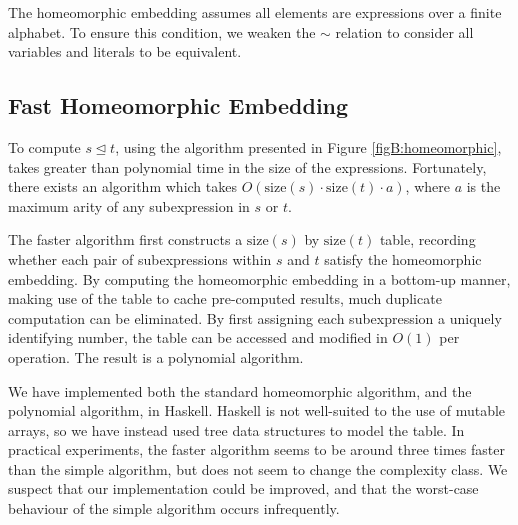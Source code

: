 The homeomorphic embedding assumes all elements are expressions over a finite alphabet. To ensure this condition, we weaken the $\sim$ relation to consider all variables and literals to be equivalent.

\subsection{Fast Homeomorphic Embedding}

To compute $s \unlhd t$, using the algorithm presented in Figure \ref{figB:homeomorphic}, takes greater than polynomial time in the size of the expressions. Fortunately, there exists an algorithm \cite{stillman:computational_problems,stillman:homeomorphic} which takes $O(\text{size}(s) \cdot \text{size}(t) \cdot a)$, where $a$ is the maximum arity of any subexpression in $s$ or $t$.

The faster algorithm first constructs a $\text{size}(s)$ by $\text{size}(t)$ table, recording whether each pair of subexpressions within $s$ and $t$ satisfy the homeomorphic embedding. By computing the homeomorphic embedding in a bottom-up manner, making use of the table to cache pre-computed results, much duplicate computation can be eliminated. By first assigning each subexpression a uniquely identifying number, the table can be accessed and modified in $O(1)$ per operation. The result is a polynomial algorithm.

We have implemented both the standard homeomorphic algorithm, and the polynomial algorithm, in Haskell. Haskell is not well-suited to the use of mutable arrays, so we have instead used tree data structures to model the table. In practical experiments, the faster algorithm seems to be around three times faster than the simple algorithm, but does not seem to change the complexity class. We suspect that our implementation could be improved, and that the worst-case behaviour of the simple algorithm occurs infrequently.
